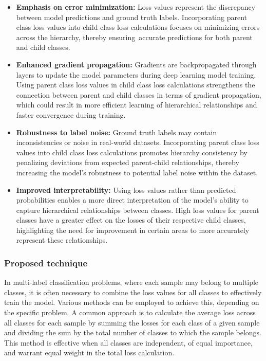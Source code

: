 \begin{itemize}
    \item \textbf{Emphasis on error minimization: }Loss values represent the discrepancy between model predictions and ground truth labels. Incorporating parent class loss values into child class loss calculations focuses on minimizing errors across the hierarchy, thereby ensuring~accurate predictions for both parent and child classes.

    \item \textbf{Enhanced gradient propagation:} Gradients are backpropagated through layers to update the model parameters during deep learning model training. Using parent class loss values in child class loss calculations strengthens the connection between parent and child classes in terms of gradient propagation, which could result in more efficient learning of hierarchical relationships and faster convergence during training.

    \item \textbf{Robustness to label noise:} Ground truth labels may contain inconsistencies or noise in real-world datasets. Incorporating parent class loss values into child class loss calculations promotes hierarchy consistency by penalizing deviations from expected parent-child relationships, thereby increasing the model's robustness to potential label noise within the dataset.

    \item \textbf{Improved interpretability:} Using loss values rather than predicted probabilities enables a more direct interpretation of the model's ability to capture hierarchical relationships between classes. High loss values for parent classes have a greater effect on the losses of their respective child classes, highlighting the need for improvement in certain areas to more accurately represent these relationships.
\end{itemize}

\subsubsection{Proposed technique}

In multi-label classification problems, where each sample may belong to multiple classes, it is often necessary to combine the loss values for all classes to effectively train the model. Various methods can be employed to achieve this, depending on the specific problem. A common approach is to calculate the average loss across all classes for each sample by summing the losses for each class of a given sample and dividing the sum by the total number of classes to which the sample belongs. This method is effective when all classes are independent, of equal importance, and warrant equal weight in the total loss calculation.

